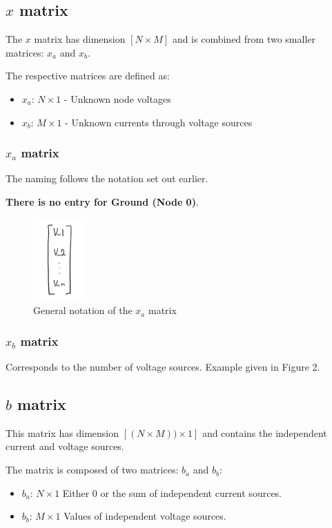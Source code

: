 \documentclass[a4paper, titlepage]{article}
\begin{document}
    \subsection{$x$ matrix}
    The $x$ matrix has dimension $[N \times M]$ and is combined from two smaller matrices: $x_a$ and $x_b$. 
    \par
    The respective matrices are defined as:
    \begin{itemize}
        \item $x_a$: $N \times 1$ - Unknown node voltages
        \item $x_b$: $M \times 1$ - Unknown currents through voltage sources
    \end{itemize}
    \subsubsection{$x_a$ matrix}
    The naming follows the notation set out earlier. \par 
    \textbf{There is no entry for Ground (Node 0)}.
    \begin{figure}[htp]
        \centering
        \includegraphics[width=20mm,scale=0.25]{Matrix4}
        \caption{General notation of the $x_a$ matrix}
        \label{fig:figure3}
    \end{figure}
    \subsubsection{$x_b$ matrix}
    Corresponds to the number of voltage sources. Example given in Figure 2.
    \subsection{$b$ matrix}
    This matrix has dimension $[(N \times M)) \times 1]$ and contains the independent current and voltage sources.
    
    The matrix is composed of two matrices: $b_a$ and $b_b$:
    \begin{itemize}
        \item $b_a$: $N \times 1$ Either 0 or the sum of independent current sources.
        \item $b_b$: $M \times 1$ Values of independent voltage sources.
    \end{itemize}
\end{document}
